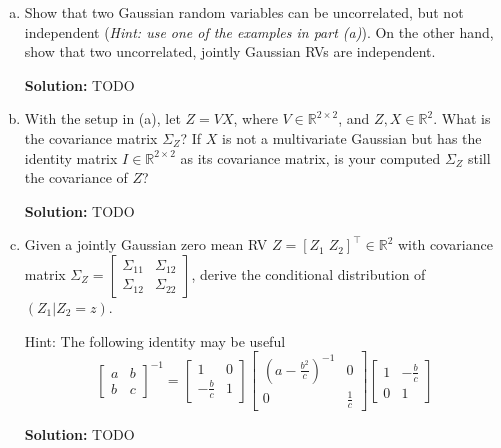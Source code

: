 \documentclass{article}
\newenvironment{solution}{\color{blue} \smallskip \textbf{Solution:}}{}
\begin{document}
\begin{enumerate}[(a)]
    \newpage
    \item Show that two Gaussian random variables can be uncorrelated, but not independent (\textit{Hint: use one of the examples in part (a)}). On the other hand, show that two uncorrelated, jointly Gaussian RVs are independent. 

    \begin{solution}
        TODO
    \end{solution}

    \newpage
    \item With the setup in (a), let $Z = V X$, where $V \in \mathbb{R}^{2 \times 2}$, and $Z, X \in \mathbb{R}^2$. What is the covariance matrix $\Sigma_Z$? If $X$ is not a multivariate Gaussian but has the identity matrix $I\in\mathbb R^{2\times 2}$ as its covariance matrix, is your computed $\Sigma_Z$ still the covariance of $Z$?

    \begin{solution}
        TODO
    \end{solution}

    \newpage
    \item Given a jointly Gaussian zero mean RV $Z = [Z_1\; Z_2]^\top\in \mathbb{R}^2$ with covariance matrix $\Sigma_Z = \begin{bmatrix} \Sigma_{11} & \Sigma_{12} \\ \Sigma_{12} & \Sigma_{22}\end{bmatrix}$, derive the conditional distribution of $(Z_1 | Z_2 = z)$.

    Hint: The following identity may be useful 
    \[
        \begin{bmatrix} a & b \\ b & c\end{bmatrix}^{-1} = \begin{bmatrix} 1 & 0 \\ -\frac{b}{c} & 1\end{bmatrix} \begin{bmatrix} \left(a - \frac{b^2}{c}\right)^{-1} & 0 \\ 0 & \frac{1}{c} \end{bmatrix}
        \begin{bmatrix} 1 &  -\frac{b}{c} \\ 0 & 1\end{bmatrix}
    \]

    \begin{solution}
        TODO
    \end{solution}
\end{enumerate}
\end{document}
